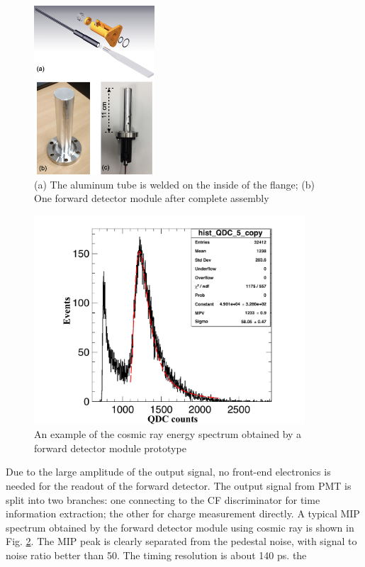 \documentclass[number]{elsarticle}
\begin{document}
\begin{figure}[htbp]
\centering
\includegraphics[width=0.4\textwidth]{./forward_module.png}
\caption{(a) The aluminum tube is welded on the inside of the flange; (b) One forward detector module after complete assembly}
\label{fig:forward_module}
\end{figure}

\begin{figure}[htbp]
\centering
\includegraphics[width=0.9\textwidth]{./forward_mip.pdf}
\caption{An example of the cosmic ray energy spectrum obtained by a forward detector module prototype}
\label{fig:forward_mip}
\end{figure}

Due to the large amplitude of the output signal, no front-end electronics is needed for the readout of the forward detector.
The output signal from PMT is split into two branches: one connecting to the CF discriminator for time information extraction; the other for charge measurement directly.
A typical MIP spectrum obtained by the forward detector module using cosmic ray is shown in Fig. \ref{fig:forward_mip}. 
The MIP peak is clearly separated from the pedestal noise, with signal to noise ratio better than 50.
The timing resolution is about 140 ps.
the
\end{document}

